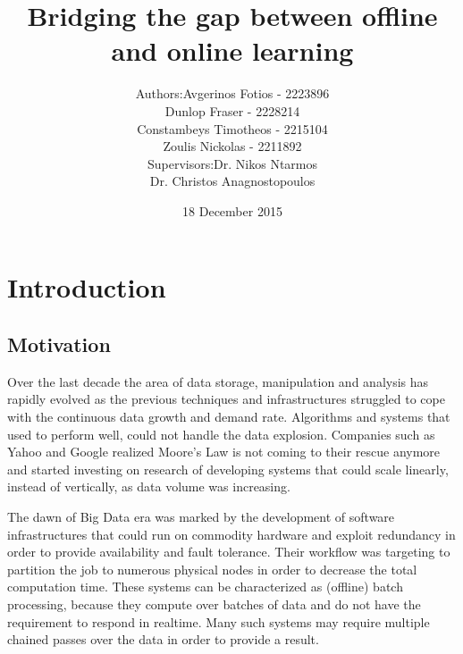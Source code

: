 \documentclass{lmproj}
\begin{document}
\title{Bridging the gap between offline and online learning}
    
\author{\begin{tabular}{r@{ }l} 
		Authors:      & Avgerinos Fotios - 2223896\\
		& Dunlop Fraser - 2228214\\
		& Constambeys Timotheos - 2215104\\
		& Zoulis Nickolas - 2211892\\[1ex] 
		Supervisors: & Dr. Nikos Ntarmos\\
		& Dr. Christos Anagnostopoulos
	\end{tabular}}    
    
\date{18 December 2015}
\maketitle

\tableofcontents
\chapter{Introduction}
\label{intro}

\section{Motivation}
\label{intro}

Over the last decade the area of data storage, manipulation and analysis has rapidly evolved as the previous techniques and infrastructures struggled to cope with the continuous data growth and demand rate. Algorithms and systems that used to perform well, could not handle the data explosion. Companies such as Yahoo and Google realized Moore's Law is not coming to their rescue anymore and started investing on research of developing systems that could scale linearly, instead of vertically, as data volume was increasing. 

The dawn of Big Data era was marked by the development of software infrastructures that could run on commodity hardware and exploit redundancy in order to provide availability and fault tolerance. Their workflow was targeting to partition the job to numerous physical nodes in order to decrease the total computation time. These systems can be characterized as (offline) batch processing, because they compute over batches of data and do not have the requirement to respond in realtime. Many such systems may require multiple chained passes over the data in order to provide a result.
\end{document}
